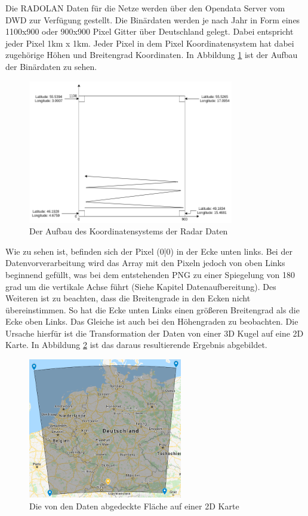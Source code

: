 \noindent
Die RADOLAN Daten für die Netze werden über den Opendata Server vom DWD zur Verfügung gestellt. 
Die Binärdaten werden je nach Jahr in Form eines 1100x900 oder 900x900 Pixel Gitter über Deutschland gelegt.  
Dabei entspricht jeder Pixel 1km x 1km. Jeder Pixel in dem Pixel Koordinatensystem hat dabei zugehörige Höhen und 
Breitengrad Koordinaten. In Abbildung \ref{fig:radolan_koordinatensystem_aufbau} ist der Aufbau der Binärdaten zu sehen.
\begin{figure}[H]
 \centering
 \includegraphics[width=0.8\textwidth,angle=0]{abb/radolan_koordinatensystem_aufbau}
 \caption[Aufbau des Koordinatensystems von Binärdaten]{Der Aufbau des Koordinatensystems der Radar Daten}
\label{fig:radolan_koordinatensystem_aufbau}
\end{figure}
Wie zu sehen ist, befinden sich der Pixel (0|0) in der Ecke unten links. Bei der Datenvorverarbeitung wird das Array mit 
den Pixeln jedoch von oben Links beginnend gefüllt, was bei dem entstehenden PNG  zu einer Spiegelung von 180 grad 
um die vertikale Achse führt (Siehe Kapitel Datenaufbereitung). 
Des Weiteren ist zu beachten, dass die Breitengrade in den Ecken nicht übereinstimmen.
So hat die Ecke unten Links einen größeren Breitengrad als die Ecke oben Links. 
Das Gleiche ist auch bei den Höhengraden zu beobachten. Die Ursache hierfür ist die Transformation der Daten von einer 
3D Kugel auf eine 2D Karte. In Abbildung \ref{fig:karte_abdeckung_daten} ist das daraus resultierende Ergebnis abgebildet. 

\begin{figure}[H]
 \centering
 \includegraphics[width=0.6\textwidth,angle=0]{abb/karte_abdeckung_daten}
 \caption[Von Daten abgedeckte Fläche]{Die von den Daten abgedeckte Fläche auf einer 2D Karte}
\label{fig:karte_abdeckung_daten}
\end{figure}

